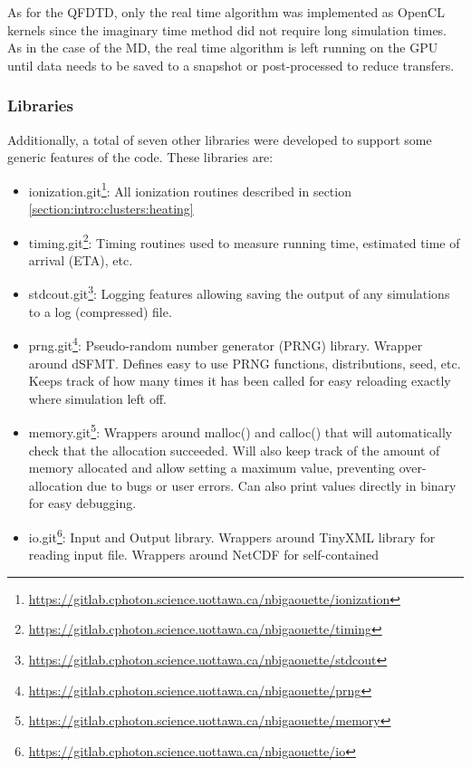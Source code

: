 As for the QFDTD, only the real time algorithm was implemented as OpenCL
kernels since the imaginary time method did not require long simulation times.
As in the case of the MD, the real time algorithm is left running on the GPU
until data needs to be saved to a snapshot or post-processed to reduce
transfers.




\subsubsection{Libraries}

Additionally, a total of seven other libraries were developed to support some
generic features of the code. These libraries are:
\begin{itemize}
\item ionization.git\footnote{ \url{
    https://gitlab.cphoton.science.uottawa.ca/nbigaouette/ionization}}:
    All ionization routines described in section
    \ref{section:intro:clusters:heating}
\item timing.git\footnote{ \url{
    https://gitlab.cphoton.science.uottawa.ca/nbigaouette/timing}}:
    Timing routines used to measure running time, estimated time of arrival
(ETA), etc.
\item stdcout.git\footnote{ \url{
    https://gitlab.cphoton.science.uottawa.ca/nbigaouette/stdcout}}:
    Logging features allowing saving the output of any simulations to a log
    (compressed) file.
\item prng.git\footnote{ \url{
    https://gitlab.cphoton.science.uottawa.ca/nbigaouette/prng}}:
    Pseudo-random number generator (PRNG) library. Wrapper around
dSFMT\cite{prng2009}. Defines easy to use PRNG functions, distributions, seed,
etc. Keeps track of how many times it has been called for easy reloading
exactly where simulation left off.
\item memory.git\footnote{ \url{
    https://gitlab.cphoton.science.uottawa.ca/nbigaouette/memory}}:
    Wrappers around malloc() and calloc() that will automatically check that
    the allocation succeeded. Will also keep track of the amount of
    memory allocated and allow setting a maximum value, preventing
    over-allocation due to bugs or user errors. Can also print values directly
    in binary for easy debugging.
\item io.git\footnote{ \url{
    https://gitlab.cphoton.science.uottawa.ca/nbigaouette/io}}:
    Input and Output library. Wrappers around TinyXML library\cite{tinyxml} for
reading input file. Wrappers around NetCDF\cite{netcdf} for self-contained

\end{itemize}
